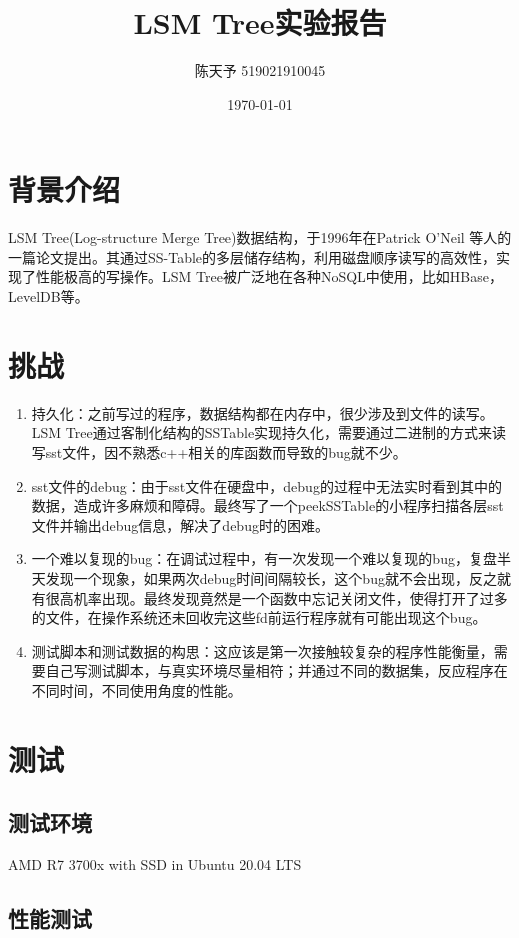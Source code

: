\documentclass{ctexart}
\title{LSM Tree实验报告}
\author{陈天予 519021910045}
\date{\today}
\begin{document}
\maketitle

\section{背景介绍}
LSM Tree(Log-structure Merge Tree)数据结构，于1996年在Patrick O’Neil 等人的一篇论文提出。其通过SS-Table的多层储存结构，利用磁盘顺序读写的高效性，实现了性能极高的写操作。LSM Tree被广泛地在各种NoSQL中使用，比如HBase，LevelDB等。

\section{挑战}
\begin{enumerate}
  \item 持久化：之前写过的程序，数据结构都在内存中，很少涉及到文件的读写。LSM Tree通过客制化结构的SSTable实现持久化，需要通过二进制的方式来读写sst文件，因不熟悉c++相关的库函数而导致的bug就不少。
  \item sst文件的debug：由于sst文件在硬盘中，debug的过程中无法实时看到其中的数据，造成许多麻烦和障碍。最终写了一个peekSSTable的小程序扫描各层sst文件并输出debug信息，解决了debug时的困难。
  \item 一个难以复现的bug：在调试过程中，有一次发现一个难以复现的bug，复盘半天发现一个现象，如果两次debug时间间隔较长，这个bug就不会出现，反之就有很高机率出现。最终发现竟然是一个函数中忘记关闭文件，使得打开了过多的文件，在操作系统还未回收完这些fd前运行程序就有可能出现这个bug。
  \item 测试脚本和测试数据的构思：这应该是第一次接触较复杂的程序性能衡量，需要自己写测试脚本，与真实环境尽量相符；并通过不同的数据集，反应程序在不同时间，不同使用角度的性能。
\end{enumerate}

\section{测试}

\subsection{测试环境}
AMD R7 3700x with SSD in Ubuntu 20.04 LTS

\subsection{性能测试}
\end{document}
